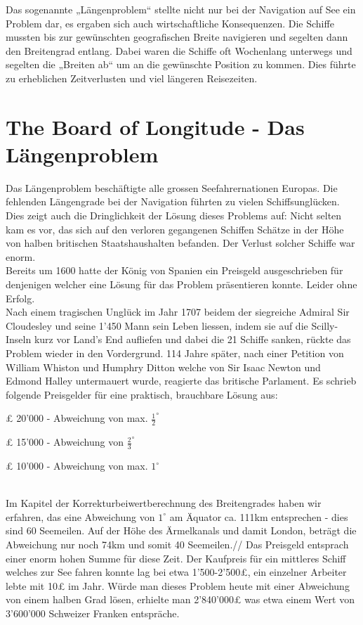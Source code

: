 \begin{refsection}
Das sogenannte „Längenproblem“ stellte nicht nur bei der Navigation auf See ein Problem dar, es ergaben sich auch wirtschaftliche Konsequenzen. Die Schiffe mussten bis zur gewünschten geografischen Breite navigieren und segelten dann den Breitengrad entlang. Dabei waren die Schiffe oft Wochenlang unterwegs und segelten die „Breiten ab“ um an die gewünschte Position zu kommen. Dies führte zu erheblichen Zeitverlusten und viel längeren Reisezeiten.


\section{The Board of Longitude - Das Längenproblem}
Das Längenproblem beschäftigte alle grossen Seefahrernationen Europas. Die fehlenden Längengrade bei der Navigation führten zu vielen Schiffsunglücken. Dies zeigt auch die Dringlichkeit der Lösung dieses Problems auf: Nicht selten kam es vor, das sich auf den verloren gegangenen Schiffen Schätze in der Höhe von halben britischen Staatshaushalten befanden. Der Verlust solcher Schiffe war enorm.\\
Bereits um 1600 hatte der König von Spanien ein Preisgeld ausgeschrieben für denjenigen welcher eine Lösung für das Problem präsentieren konnte. Leider ohne Erfolg. \\

Nach einem tragischen Unglück im Jahr 1707 beidem der siegreiche Admiral Sir Cloudesley und seine 1’450 Mann sein Leben liessen, indem sie auf die Scilly-Inseln kurz vor Land’s End aufliefen und dabei die 21 Schiffe sanken, rückte das Problem wieder in den Vordergrund.
114 Jahre später, nach einer Petition von William Whiston und Humphry Ditton welche von Sir Isaac Newton und Edmond Halley untermauert wurde, reagierte das britische Parlament.
Es schrieb folgende Preisgelder für eine praktisch, brauchbare Lösung aus:\\

\begin{compactitem}
\item £ 20’000 - Abweichung von max. $\frac{1}{2}^{\circ}$
\item £ 15’000 - Abweichung von $\frac{2}{3}^{\circ}$
\item £ 10’000 - Abweichung von max. $1 ^{\circ}$
\end{compactitem}
\\
Im Kapitel der Korrekturbeiwertberechnung des Breitengrades haben wir erfahren, das eine Abweichung von $1 ^{\circ}$ am Äquator ca. 111km entsprechen - dies sind 60 Seemeilen.
Auf der Höhe des Ärmelkanals und damit London, beträgt die Abweichung nur noch 74km und somit 40 Seemeilen.//
Das Preisgeld entsprach einer enorm hohen Summe für diese Zeit. Der Kaufpreis für ein mittleres Schiff welches zur See fahren konnte lag bei etwa 1’500-2’500£, ein einzelner Arbeiter lebte mit 10£ im Jahr.
Würde man dieses Problem heute mit einer Abweichung von einem halben Grad lösen, erhielte man 2’840’000£ was etwa einem Wert von 3’600’000 Schweizer Franken entspräche. \\


\end{refsection}
